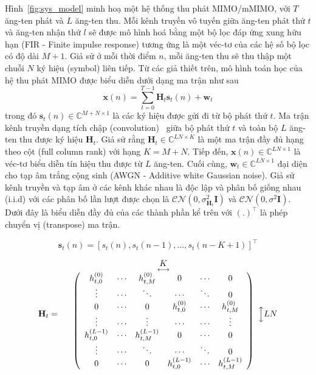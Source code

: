 Hình~\ref{fig:sys_model} minh hoạ một hệ thống thu phát MIMO/mMIMO, với $T$ ăng-ten phát và $L$ ăng-ten thu. Mỗi kênh truyền vô tuyến giữa ăng-ten phát thứ $t$ và ăng-ten nhận thứ $l$ sẽ được mô hình hoá bằng một bộ lọc đáp ứng xung hữu hạn (FIR - Finite impulse response) tương ứng là một véc-tơ của các hệ số bộ lọc có độ dài $M+1$. Giả sử ở mỗi thời điểm $n$, mỗi ăng-ten thu sẽ thu thập một chuỗi $N$ ký hiệu (symbol) liên tiếp. Từ các giả thiết trên, mô hình toán học của hệ thu phát MIMO được biểu diễn dưới dạng ma trận như sau
\begin{equation}
    \mathbf{x}(n) = \sum_{t=0}^{T-1}\mathbf{H}_t \mathbf{s}_t(n) + \mathbf{w}_t
\end{equation}
trong đó $\mathbf{s}_t(n) \in \mathbb{C}^{M+N \times 1}$ là các ký hiệu được gửi đi từ bộ phát thứ $t$. Ma trận kênh truyền dạng tích chập (convolution)~\cite{original} giữa bộ phát thứ $t$ và toàn bộ $L$ ăng-ten thu được ký hiệu $\mathbf{H}_t$. Giả sử rằng $\mathbf{H}_t \in \mathbb{C}^{LN \times K}$ là một ma trận đầy đủ hạng theo cột (full column rank) với hạng $K = M+N$. Tiếp đến, $\mathbf{x}(n) \in \mathbb{C}^{LN \times 1}$ là véc-tơ biểu diễn tín hiệu thu được từ $L$ ăng-ten. Cuối cùng, $\mathbf{w}_t \in \mathbb{C}^{LN \times 1}$ đại diện cho tạp âm trắng cộng sinh (AWGN - Additive white Gaussian noise). Giả sử kênh truyền và tạp âm ở các kênh khác nhau là độc lập và phân bố giống nhau (i.i.d) với các phân bố lần lượt được chọn là $\mathcal{CN}(0, \sigma_{\mathbf{H}_t}^2 \mathbf{I})$ và $\mathcal{CN}(0, \sigma^2 \mathbf{I})$. Dưới đây là biểu diễn đầy đủ của các thành phần kể trên với $(.)^\top$ là phép chuyển vị (transpose) ma trận.

\begin{equation}
    \mathbf{s}_t(n) = [s_t(n), s_t(n-1),\ldots,s_t(n-K+1)]^\top
\end{equation}

\begin{equation}
    \mathbf{H}_t= 
    \begin{array}{cc}
         & \underset{\longleftrightarrow}{K}\\
         & \left(\begin{array}{cccccc}
    h_{t, 0}^{(0)} & \cdots & h_{t, M}^{(0)} & 0 & \cdots & 0 \\
    \vdots & \cdots & \ddots & \cdots & \ddots & 0 \\
    0 & \cdots & 0 & h_{t, 0}^{(0)} & \cdots & h_{t, M}^{(0)} \\
    \vdots & \cdots & \vdots & \cdots & \cdots & \vdots \\
    h_{t, 0}^{(L-1)} & \cdots & h_{t, M}^{(L-1)} & 0 & \cdots & 0 \\
    \vdots & \cdots & \ddots & \cdots & \ddots & 0 \\
    0 & \cdots & 0 & h_{t, 0}^{(L-1)} & \cdots & h_{t, M}^{(L-1)}
    \end{array}
    \right) 
    \end{array}
    \Big\updownarrow LN    
\end{equation}


